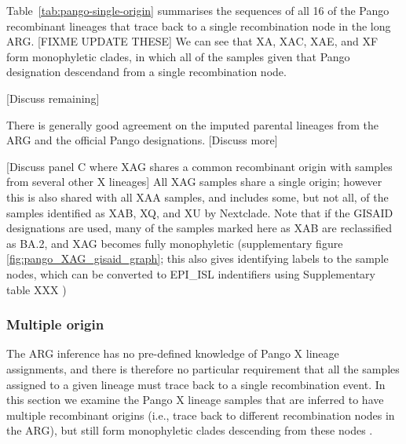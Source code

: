 \documentclass{article}
\begin{document}
Table~\ref{tab:pango-single-origin} summarises the sequences of all 16 of the Pango recombinant lineages that trace back to a single recombination node in the long ARG.
[FIXME UPDATE THESE]
We can see that XA, XAC, XAE, and XF form monophyletic clades, in which all of the samples given that Pango designation descendand from a single recombination node.

[Discuss remaining]

There is generally good agreement on the imputed parental lineages from the ARG and the official Pango designations. [Discuss more]

[Discuss panel C where XAG shares a common recombinant origin with samples from several other X lineages]
All XAG samples share a single origin; however this is also shared with all XAA samples, and includes some, but not all, of the samples identified as XAB, XQ, and XU by Nextclade. Note that if the GISAID designations are used, many of the samples marked here as XAB are reclassified as BA.2, and XAG becomes fully monophyletic (supplementary figure \ref{fig:pango_XAG_gisaid_graph}; this also gives identifying labels to the sample nodes, which can be converted to EPI\_ISL indentifiers using Supplementary table XXX )

\subsubsection{Multiple origin}
The ARG inference has no pre-defined knowledge of Pango X lineage assignments, and there is therefore no particular requirement that all the samples assigned to a given lineage must trace back to a single recombination event. In this section we examine the Pango X lineage samples that are inferred to have multiple recombinant origins (i.e., trace back to different recombination nodes in the ARG), but still form monophyletic clades %
descending from these nodes .
\end{document}
